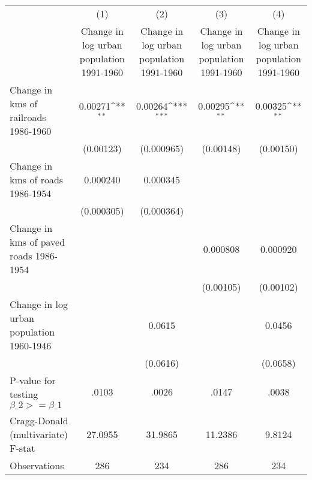 {
\def\sym#1{\ifmmode^{#1}\else\(^{#1}\)\fi}
\begin{tabular}{l*{4}{c}}
\hline\hline
                &\multicolumn{1}{c}{(1)}&\multicolumn{1}{c}{(2)}&\multicolumn{1}{c}{(3)}&\multicolumn{1}{c}{(4)}\\
                &\multicolumn{1}{c}{Change in log urban population 1991-1960}&\multicolumn{1}{c}{Change in log urban population 1991-1960}&\multicolumn{1}{c}{Change in log urban population 1991-1960}&\multicolumn{1}{c}{Change in log urban population 1991-1960}\\
\hline
Change in kms of railroads 1986-1960&  0.00271\sym{**} &  0.00264\sym{***}&  0.00295\sym{**} &  0.00325\sym{**} \\
                &(0.00123)         &(0.000965)         &(0.00148)         &(0.00150)         \\
[1em]
Change in kms of roads 1986-1954& 0.000240         & 0.000345         &                  &                  \\
                &(0.000305)         &(0.000364)         &                  &                  \\
[1em]
Change in kms of paved roads 1986-1954&                  &                  & 0.000808         & 0.000920         \\
                &                  &                  &(0.00105)         &(0.00102)         \\
[1em]
Change in log urban population 1960-1946&                  &   0.0615         &                  &   0.0456         \\
                &                  & (0.0616)         &                  & (0.0658)         \\
\hline
P-value for testing $\beta\_{2} >= \beta\_{1}$&    .0103         &    .0026         &    .0147         &    .0038         \\
Cragg-Donald (multivariate) F-stat&  27.0955         &  31.9865         &  11.2386         &   9.8124         \\
Observations    &      286         &      234         &      286         &      234         \\
\hline\hline
\end{tabular}
}
